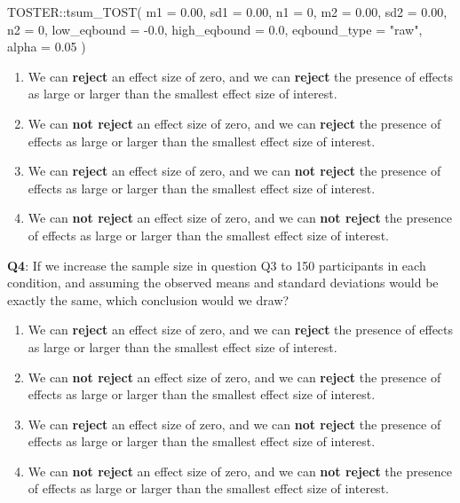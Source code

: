 \documentclass[
  oneside]{book}
\newenvironment{Shaded}{\begin{snugshade}}{\end{snugshade}}
\newcommand{\AttributeTok}[1]{\textcolor[rgb]{0.77,0.63,0.00}{#1}}
\newcommand{\DecValTok}[1]{\textcolor[rgb]{0.00,0.00,0.81}{#1}}
\newcommand{\FloatTok}[1]{\textcolor[rgb]{0.00,0.00,0.81}{#1}}
\newcommand{\FunctionTok}[1]{\textcolor[rgb]{0.00,0.00,0.00}{#1}}
\newcommand{\NormalTok}[1]{#1}
\newcommand{\SpecialCharTok}[1]{\textcolor[rgb]{0.00,0.00,0.00}{#1}}
\newcommand{\StringTok}[1]{\textcolor[rgb]{0.31,0.60,0.02}{#1}}
\providecommand{\tightlist}{%
  \setlength{\itemsep}{0pt}\setlength{\parskip}{0pt}}
\begin{document}
\begin{Shaded}
\begin{Highlighting}[]
\NormalTok{TOSTER}\SpecialCharTok{::}\FunctionTok{tsum\_TOST}\NormalTok{(}
  \AttributeTok{m1 =} \FloatTok{0.00}\NormalTok{,}
  \AttributeTok{sd1 =} \FloatTok{0.00}\NormalTok{,}
  \AttributeTok{n1 =} \DecValTok{0}\NormalTok{,}
  \AttributeTok{m2 =} \FloatTok{0.00}\NormalTok{,}
  \AttributeTok{sd2 =} \FloatTok{0.00}\NormalTok{,}
  \AttributeTok{n2 =} \DecValTok{0}\NormalTok{,}
  \AttributeTok{low\_eqbound =} \SpecialCharTok{{-}}\FloatTok{0.0}\NormalTok{,}
  \AttributeTok{high\_eqbound =} \FloatTok{0.0}\NormalTok{,}
  \AttributeTok{eqbound\_type =} \StringTok{"raw"}\NormalTok{,}
  \AttributeTok{alpha =} \FloatTok{0.05}
\NormalTok{)}
\end{Highlighting}
\end{Shaded}

\begin{enumerate}
\def\labelenumi{\Alph{enumi})}
\tightlist
\item
  We can \textbf{reject} an effect size of zero, and we can \textbf{reject} the presence of effects as large or larger than the smallest effect size of interest.
\item
  We can \textbf{not reject} an effect size of zero, and we can \textbf{reject} the presence of effects as large or larger than the smallest effect size of interest.
\item
  We can \textbf{reject} an effect size of zero, and we can \textbf{not reject} the presence of effects as large or larger than the smallest effect size of interest.
\item
  We can \textbf{not reject} an effect size of zero, and we can \textbf{not reject} the presence of effects as large or larger than the smallest effect size of interest.
\end{enumerate}

\textbf{Q4}: If we increase the sample size in question Q3 to 150 participants in each condition, and assuming the observed means and standard deviations would be exactly the same, which conclusion would we draw?

\begin{enumerate}
\def\labelenumi{\Alph{enumi})}
\tightlist
\item
  We can \textbf{reject} an effect size of zero, and we can \textbf{reject} the presence of effects as large or larger than the smallest effect size of interest.
\item
  We can \textbf{not reject} an effect size of zero, and we can \textbf{reject} the presence of effects as large or larger than the smallest effect size of interest.
\item
  We can \textbf{reject} an effect size of zero, and we can \textbf{not reject} the presence of effects as large or larger than the smallest effect size of interest.
\item
  We can \textbf{not reject} an effect size of zero, and we can \textbf{not reject} the presence of effects as large or larger than the smallest effect size of interest.
\end{enumerate}
\end{document}
